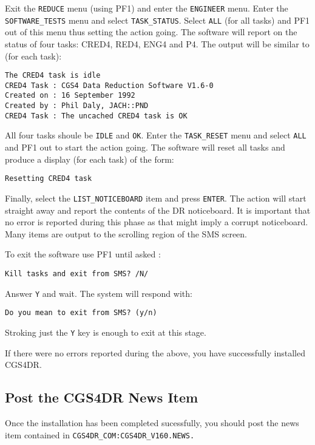 Exit the {\tt REDUCE} menu (using PF1)  and enter the {\tt ENGINEER} menu.
Enter the {\tt SOFTWARE\_TESTS} menu and select {\tt TASK\_STATUS}. Select
{\tt ALL} (for all tasks) and PF1 out of this menu thus setting the action
going. The software will report on the status of four tasks: CRED4, RED4,
ENG4 and P4. The output will be similar to (for each task):

\begin{verbatim}
The CRED4 task is idle
CRED4 Task : CGS4 Data Reduction Software V1.6-0
Created on : 16 September 1992
Created by : Phil Daly, JACH::PND
CRED4 Task : The uncached CRED4 task is OK
\end{verbatim}

All four tasks shoule be {\tt IDLE} and {\tt OK}. Enter the {\tt TASK\_RESET}
menu and select {\tt ALL} and PF1 out to start the action going. The software
will reset all tasks and produce a display (for each task) of the form:

\begin{verbatim}
Resetting CRED4 task
\end{verbatim}

Finally, select the {\tt LIST\_NOTICEBOARD} item and press {\tt ENTER}. The
action will start straight away and report the contents of the DR noticeboard.
It is important that no error is reported during this phase as that might
imply a corrupt noticeboard. Many items are output to the scrolling region
of the SMS screen.

To exit the software use PF1 until asked :

\begin{verbatim}
Kill tasks and exit from SMS? /N/
\end{verbatim}

Answer {\tt Y} and wait. The system will respond with:

\begin{verbatim}
Do you mean to exit from SMS? (y/n)
\end{verbatim}

Stroking just the {\tt Y} key is enough to exit at this stage.

If there were no errors reported during the above, you have successfully
installed CGS4DR.

\subsection{Post the CGS4DR News Item}

Once the installation has been completed sucessfully, you should post the
news item contained in {\tt CGS4DR\_COM:CGS4DR\_V160.NEWS.}


